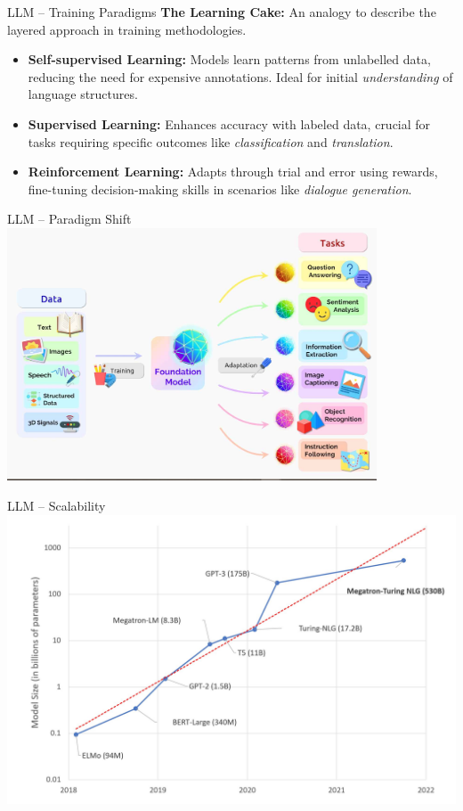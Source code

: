 \documentclass[presentation, 10pt]{beamer}\mode<presentation>{\usetheme{AMSBolognaFC}}
\begin{document}
\begin{frame}{LLM -- Training Paradigms}
\textbf{The Learning Cake:} An analogy to describe the layered approach in training methodologies.
\begin{itemize}
    \item \textbf{Self-supervised Learning:} Models learn patterns from unlabelled data, reducing the need for expensive annotations. Ideal for initial \emph{understanding} of language structures.
    \item \textbf{Supervised Learning:} Enhances accuracy with labeled data, crucial for tasks requiring specific outcomes like \emph{classification} and \emph{translation}.
    \item \textbf{Reinforcement Learning:} Adapts through trial and error using rewards, fine-tuning decision-making skills in scenarios like \emph{dialogue generation}.
\end{itemize}
\end{frame}
\begin{frame}{LLM -- Paradigm Shift}
	\centering
	\includegraphics[height=7.5cm]{img/llm-idea.jpg}
\end{frame}
\begin{frame}{LLM -- Scalability}
	\includegraphics[width=\textwidth]{img/over-year.jpg}
\end{frame}
\end{document}
